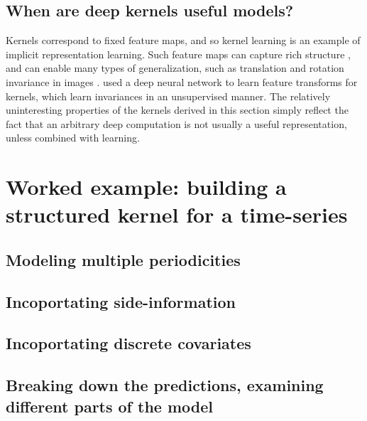 

\subsection{When are deep kernels useful models?}

Kernels correspond to fixed feature maps, and so kernel learning is an example of implicit representation learning. %
Such feature maps can capture rich structure \citep{DuvLloGroetal13}, and can enable many types of generalization, such as translation and rotation invariance in images \citep{kondor2008group}.
\cite{SalHin08} used a deep neural network to learn feature transforms for kernels, which learn invariances in an unsupervised manner.
The relatively uninteresting properties of the kernels derived in this section simply reflect the fact that an arbitrary deep computation is not usually a useful representation, unless combined with learning.




\section{Worked example: building a structured kernel for a time-series}

\subsection{Modeling multiple periodicities}

\subsection{Incoportating side-information}

\subsection{Incoportating discrete covariates}

\subsection{Breaking down the predictions, examining different parts of the model}


\outbpdocument{


}


